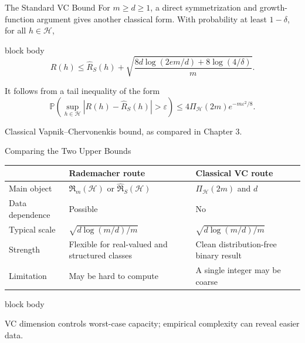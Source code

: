 \documentclass[aspectratio=169,10pt]{beamer}
\newcommand{\Hc}{\mathcal{H}}
\newcommand{\Rhat}{\widehat{R}_S}
\newcommand{\Rad}{\mathfrak{R}}
\newcommand{\RadS}{\widehat{\mathfrak{R}}_S}
\newcommand{\PiH}{\Pi_{\Hc}}
\newcommand{\eps}{\varepsilon}
\newcommand{\Prb}{\mathbb{P}}
\newcommand{\abs}[1]{\left\lvert #1\right\rvert}
\newcommand{\SourceNote}[1]{%
  \vfill
  \begin{flushright}
    {\scriptsize\color{midgray}#1}
  \end{flushright}
}
\newcommand{\KeyBox}[1]{%
  \begin{beamercolorbox}[rounded=true,sep=0.22cm,wd=\linewidth]{block body}
    #1
  \end{beamercolorbox}%
}
\begin{document}
\begin{frame}[t]{The Standard VC Bound}
  \vspace{0.02cm}
  For $m\ge d\ge1$, a direct symmetrization and growth-function argument gives another classical form. With probability at least $1-\delta$, for all $h\in\Hc$,
  \begin{beamercolorbox}[rounded=true,sep=0.18cm,wd=\linewidth]{block body}
    \[
      \boxed{
      R(h)\le\Rhat(h)
      +\sqrt{
        \frac{8d\log(2em/d)+8\log(4/\delta)}{m}
      }.}
    \]
  \end{beamercolorbox}
  \vspace{0.10cm}
  It follows from a tail inequality of the form
  \[
    \Prb\!\left(\sup_{h\in\Hc}\abs{R(h)-\Rhat(h)}>\eps\right)
    \le 4\PiH(2m)e^{-m\eps^2/8}.
  \]
  \SourceNote{Classical Vapnik--Chervonenkis bound, as compared in Chapter 3.}
\end{frame}

\begin{frame}[t]{Comparing the Two Upper Bounds}
  \vspace{0.01cm}
  {\small
  \renewcommand{\arraystretch}{1.17}
  \begin{center}
  \begin{tabular}{p{2.55cm}p{4.15cm}p{4.15cm}}
    \toprule
     & \textbf{Rademacher route} & \textbf{Classical VC route}\\
    \midrule
    Main object & $\Rad_m(\Hc)$ or $\RadS(\Hc)$ & $\PiH(2m)$ and $d$\\
    Data dependence & Possible & No\\
    Typical scale & $\sqrt{d\log(m/d)/m}$ & $\sqrt{d\log(m/d)/m}$\\
    Strength & Flexible for real-valued and structured classes & Clean distribution-free binary result\\
    Limitation & May be hard to compute & A single integer may be coarse\\
    \bottomrule
  \end{tabular}
  \end{center}}
  \vspace{0.08cm}
  \KeyBox{\small\raggedright VC dimension controls worst-case capacity; empirical complexity can reveal easier data.\par}
\end{frame}
\end{document}
